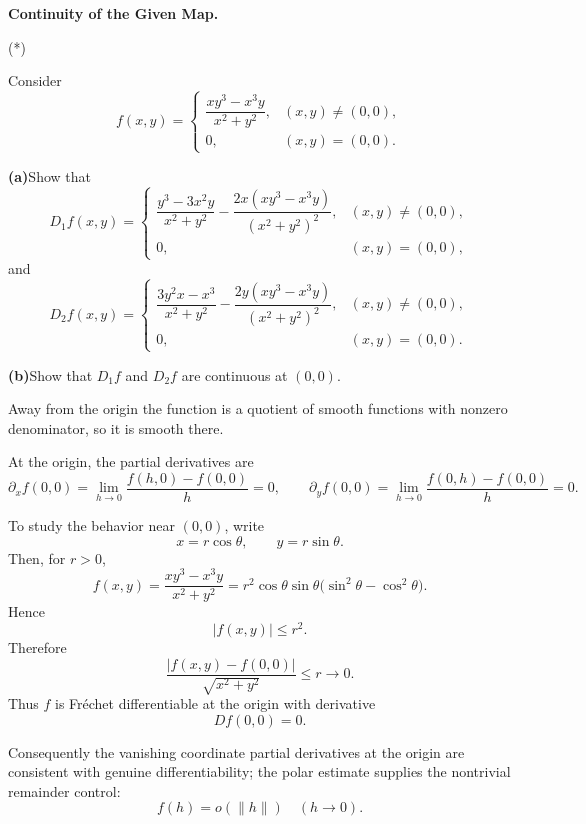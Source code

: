 \begin{problem}[CP-II-0534]
\label{prob:cp-ii-0534}
\textbf{Continuity of the Given Map.}

\hspace*{1.5em}(*)

Consider
\[
f(x,y)=
\begin{cases}
	\dfrac{xy^3-x^3y}{x^2+y^2}, & (x,y)\neq (0,0),\\
	0, & (x,y)=(0,0).
\end{cases}
\]

	\par\smallskip\noindent\textbf{(a)}\quad Show that
	\[
	D_1f(x,y)=
	\begin{cases}
		\dfrac{y^3-3x^2y}{x^2+y^2}-\dfrac{2x(xy^3-x^3y)}{(x^2+y^2)^2}, & (x,y)\neq (0,0),\\
		0, & (x,y)=(0,0),
	\end{cases}
	\]
	and
	\[
	D_2f(x,y)=
	\begin{cases}
		\dfrac{3y^2x-x^3}{x^2+y^2}-\dfrac{2y(xy^3-x^3y)}{(x^2+y^2)^2}, & (x,y)\neq (0,0),\\
		0, & (x,y)=(0,0).
	\end{cases}
	\]

	\par\smallskip\noindent\textbf{(b)}\quad Show that $D_1f$ and $D_2f$ are continuous at $(0,0)$.
\end{problem}

\begin{solution}
Away from the origin the function is a quotient of smooth functions with nonzero
denominator, so it is smooth there.

At the origin, the partial derivatives are
\[
\partial_x f(0,0)
=
\lim_{h\to0}\frac{f(h,0)-f(0,0)}{h}=0,
\qquad
\partial_y f(0,0)
=
\lim_{h\to0}\frac{f(0,h)-f(0,0)}{h}=0.
\]

To study the behavior near \((0,0)\), write
\[
x=r\cos\theta,\qquad y=r\sin\theta.
\]
Then, for \(r>0\),
\[
f(x,y)
=
\frac{xy^3-x^3y}{x^2+y^2}
=
r^2\cos\theta\sin\theta
\bigl(\sin^2\theta-\cos^2\theta\bigr).
\]
Hence
\[
|f(x,y)|\le r^2.
\]
Therefore
\[
\frac{|f(x,y)-f(0,0)|}{\sqrt{x^2+y^2}}
\le r\longrightarrow0.
\]
Thus \(f\) is Fréchet differentiable at the origin with derivative
\[
Df(0,0)=0.
\]

Consequently the vanishing coordinate partial derivatives at the origin are
consistent with genuine differentiability; the polar estimate supplies the
nontrivial remainder control:
\[
\boxed{f(h)=o(\|h\|)\quad(h\to0).}
\]
\end{solution}

